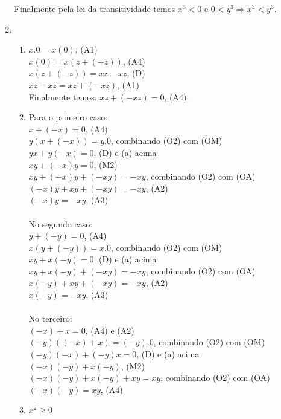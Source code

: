 \begin{enumerate}
	Finalmente pela lei da transitividade temos $x^3 < 0$ e $0 < y^3 \Rightarrow x^3 < y^3$.
	
	\item %
		\begin{enumerate}
			\item %
			$x.0 = x(0)$, (A1)\\
			$ x(0) = x(z + (-z))$, (A4)\\ 
			$x(z + (-z)) = xz - xz $, (D)\\
			$xz - xz = xz + (-xz) $, (A1)\\ 
			Finalmente temos: $xz + (-xz) = 0$, (A4).
			\item %
			Para o primeiro caso:\\
			$x + (-x) = 0$, (A4)\\							
			$y(x + (-x)) = y.0$, combinando (O2) com (OM)\\
			$yx + y(-x) = 0$, (D) e (a) acima\\
			$xy + (-x)y = 0$, (M2)\\						
			$xy + (-x)y + (-xy) = -xy$, combinando (O2) com (OA)\\
			$(-x)y + xy + (-xy) = -xy$, (A2)\\
			$(-x)y = -xy$, (A3)\\	
			\\	
			No segundo caso:\\
			$y + (-y) = 0$, (A4)\\							
			$x(y + (-y)) = x.0$, combinando (O2) com (OM)\\
			$xy + x(-y) = 0$, (D) e (a) acima\\
			$xy + x(-y) + (-xy) = -xy$, combinando (O2) com (OA)\\
			$x(-y) + xy + (-xy) = -xy$, (A2)\\
			$x(-y) = -xy$, (A3)\\		
			\\
			No terceiro:\\
			$(-x) + x = 0$, (A4) e (A2)\\
			$(-y)((-x) + x) = (-y).0$, combinando (O2) com (OM)\\
			$(-y)(-x) + (-y)x = 0$, (D) e (a) acima\\
			$(-x)(-y) + x(-y)$, (M2)\\
			$(-x)(-y) + x(-y) + xy = xy$, combinando (O2) com (OA)\\
			$(-x)(-y) = xy$, (A4)
			\item %
			$x^2 \geq 0$\\

\end{enumerate}
\end{enumerate}
